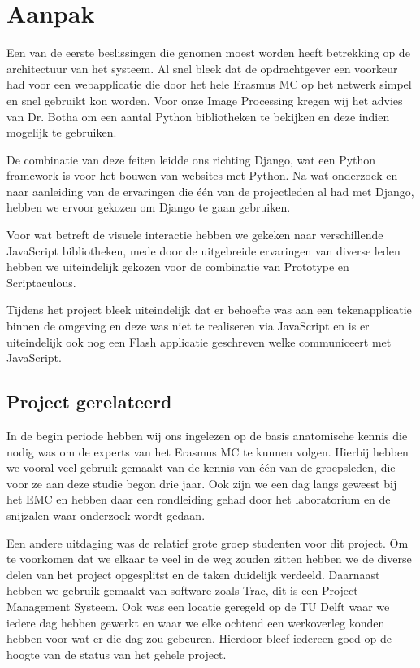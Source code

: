 \section{Aanpak}
\label{Aanpak}
Een van de eerste beslissingen die genomen moest worden heeft betrekking op de architectuur van het systeem. 
Al snel bleek dat de opdrachtgever een voorkeur had voor een webapplicatie die door het hele Erasmus MC op het netwerk simpel en snel gebruikt kon worden. 
Voor onze Image Processing kregen wij het advies van Dr. Botha om een aantal Python bibliotheken te bekijken en deze indien mogelijk te gebruiken. 

De combinatie van deze feiten leidde ons richting Django, wat een Python framework is voor het bouwen van websites met Python. 
Na wat onderzoek en naar aanleiding van de ervaringen die \'{e}\'{e}n van de projectleden al had met Django, hebben we ervoor gekozen om Django te gaan gebruiken. 

Voor wat betreft de visuele interactie hebben we gekeken naar verschillende JavaScript bibliotheken, mede door de uitgebreide ervaringen van diverse leden hebben we uiteindelijk gekozen voor de combinatie van Prototype en Scriptaculous.

Tijdens het project bleek uiteindelijk dat er behoefte was aan een tekenapplicatie binnen de omgeving en deze was niet te realiseren via JavaScript en is er uiteindelijk ook nog een Flash applicatie geschreven welke communiceert met JavaScript.

\subsection{Project gerelateerd}
\label{aanpak_project_gerelateerd}
In de begin periode hebben wij ons ingelezen op de basis anatomische kennis die nodig was om de experts van het Erasmus MC te kunnen volgen. Hierbij hebben we vooral veel gebruik gemaakt van de kennis van \'{e}\'{e}n van de groepsleden, die voor ze aan deze studie begon drie jaar. Ook zijn we een dag langs geweest bij het EMC en hebben daar een rondleiding gehad door het laboratorium en de snijzalen waar onderzoek wordt gedaan. 

Een andere uitdaging was de relatief grote groep studenten voor dit project. 
Om te voorkomen dat we elkaar te veel in de weg zouden zitten hebben we de diverse delen van het project opgesplitst en de taken duidelijk verdeeld. 
Daarnaast hebben we gebruik gemaakt van software zoals Trac, dit is een Project Management Systeem. 
Ook was een locatie geregeld op de TU Delft waar we iedere dag hebben gewerkt en waar we elke ochtend een werkoverleg konden hebben voor wat er die dag zou gebeuren. 
Hierdoor bleef iedereen goed op de hoogte van de status van het gehele project.

